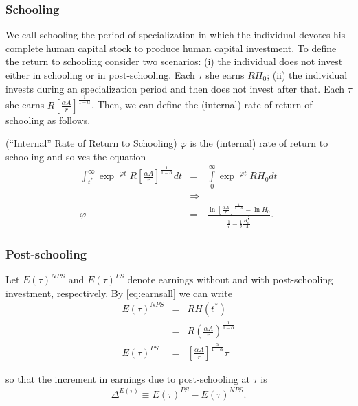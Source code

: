 \subsubsection{Schooling}
We call schooling the period of specialization in which the individual devotes his complete human capital stock to produce human capital investment. To define the return to schooling consider two scenarios: (i) the individual does not invest either in schooling or in post-schooling. Each $\tau$ she earns $RH_{0}$; (ii) the individual invests during an specialization period and then does not invest after that. Each $\tau$ she earns $R \left[ \frac{\alpha A}{r} \right]^{\frac{1}{1-\alpha}}$. Then, we can define the (internal) rate of return of schooling as follows.

\begin{definition} (``Internal'' Rate of Return to Schooling)
$\varphi$ is the (internal) rate of return to schooling and solves the equation
\begin{eqnarray}
\int _{t^*} ^{\infty} \exp^{- \varphi t} R \left[ \frac{\alpha A}{r} \right]^{\frac{1}{1-\alpha}} dt &=& \int \limits _{0} ^{\infty} \exp^{- \varphi t} R H_{0} dt \nonumber \\
&\Rightarrow& \nonumber \\
\varphi &=& \frac{\ln \left[ \frac{\alpha A}{r} \right]^{\frac{1}{1 - \alpha}} - \ln H_{0}}{\frac{1}{r} - \frac{1}{2} \frac{H_{0}^{\frac{1}{2}}}{A}}.
\end{eqnarray}
\end{definition}

\subsubsection{Post-schooling}
Let $E(\tau)^{NPS}$ and $E(\tau)^{PS}$ denote earnings without and with post-schooling investment, respectively. By \eqref{eq:earnsall} we can write
\begin{eqnarray}
E(\tau)^{NPS} &=& R H(t^*) \\ \nonumber
&=& R \left( \frac{\alpha A}{r} \right)^{\frac{1}{1 - \alpha}} \\ \nonumber
E(\tau)^{PS} &=& \left[ \frac{\alpha A}{r} \right]^{\frac{\alpha}{1-\alpha}} \tau
\end{eqnarray}

\noindent so that the increment in earnings due to post-schooling at $\tau$ is
\begin{eqnarray}
\Delta^{E(\tau)} \equiv E(\tau)^{PS} - E(\tau)^{NPS}.
\end{eqnarray}

